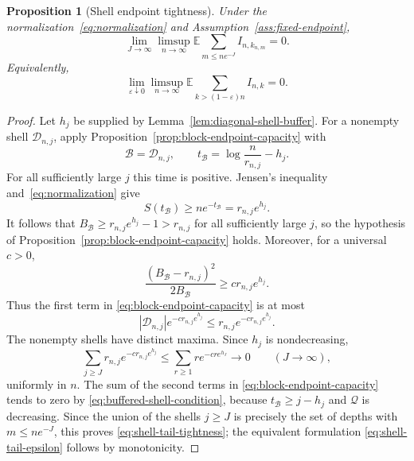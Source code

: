 \documentclass[11pt]{article}
\newtheorem{proposition}[theorem]{Proposition}
\theoremstyle{remark}
\theoremstyle{plain}
\newcommand{\E}{\mathbb E}
\newcommand{\eps}{\varepsilon}
\begin{document}
\begin{proposition}[Shell endpoint tightness]
\label{prop:endpoint-bound}
Under the normalization~\eqref{eq:normalization} and
Assumption~\ref{ass:fixed-endpoint},
\begin{equation}\label{eq:shell-tail-tightness}
 \lim_{J\to\infty}\limsup_{n\to\infty}
 \E\sum_{m\le ne^{-J}} I_{n,k_{n,m}}=0.
\end{equation}
Equivalently,
\begin{equation}\label{eq:shell-tail-epsilon}
 \lim_{\eps\downarrow0}\limsup_{n\to\infty}
 \E\sum_{k>(1-\eps)n}I_{n,k}=0.
\end{equation}
\end{proposition}

\begin{proof}
Let $h_j$ be supplied by Lemma~\ref{lem:diagonal-shell-buffer}.  For a
nonempty shell $\mathcal D_{n,j}$, apply
Proposition~\ref{prop:block-endpoint-capacity} with
 \[
 \mathcal B=\mathcal D_{n,j},
 \qquad
 t_{\mathcal B}=\log\frac{n}{r_{n,j}}-h_j.
\]
For all sufficiently large $j$ this time is positive.  Jensen's inequality
and~\eqref{eq:normalization} give
\[
 S(t_{\mathcal B})
 \ge ne^{-t_{\mathcal B}}
 =r_{n,j}e^{h_j}.
\]
It follows that
$B_{\mathcal B}\ge r_{n,j}e^{h_j}-1>r_{n,j}$ for all sufficiently large
$j$, so the hypothesis of Proposition~\ref{prop:block-endpoint-capacity}
holds.  Moreover, for a universal $c>0$,
\[
 \frac{(B_{\mathcal B}-r_{n,j})^2}{2B_{\mathcal B}}
 \ge c r_{n,j}e^{h_j}.
\]
Thus the first term in
\eqref{eq:block-endpoint-capacity} is at most
\[
 |\mathcal D_{n,j}|e^{-c r_{n,j}e^{h_j}}
 \le r_{n,j}e^{-c r_{n,j}e^{h_j}}.
\]
The nonempty shells have distinct maxima.  Since $h_j$ is nondecreasing,
\[
 \sum_{j\ge J}r_{n,j}e^{-c r_{n,j}e^{h_j}}
 \le\sum_{r\ge1}r e^{-c r e^{h_J}}
 \longrightarrow0
 \qquad(J\to\infty),
\]
uniformly in $n$.  The sum of the second terms in
\eqref{eq:block-endpoint-capacity} tends to zero by
\eqref{eq:buffered-shell-condition}, because
$t_{\mathcal B}\ge j-h_j$ and $\mathcal Q$ is decreasing.  Since the union
of the shells $j\ge J$
is precisely the set of depths with $m\le ne^{-J}$, this proves
\eqref{eq:shell-tail-tightness}; the equivalent formulation
\eqref{eq:shell-tail-epsilon} follows by monotonicity.
\end{proof}
\end{document}
